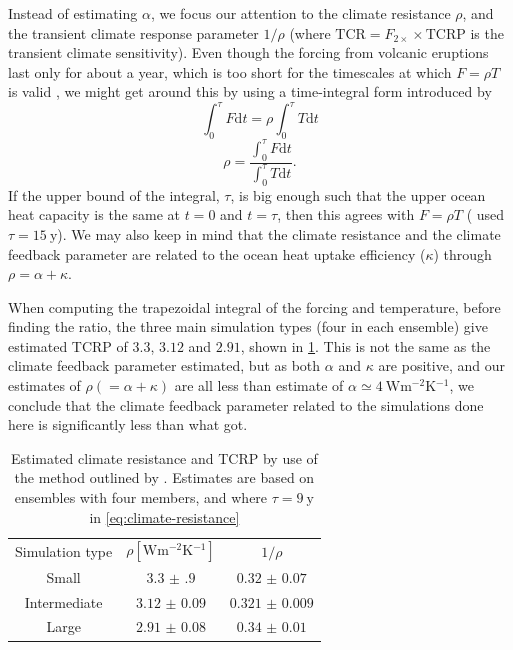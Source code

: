 \documentclass{ametsocV5}
\begin{document}
Instead of estimating \(\alpha \), we focus our attention to the climate resistance
\(\rho \), and the transient climate response parameter \(1/\rho\) (where
\(\mathrm{TCR}=F_{2\times}\times \mathrm{TCRP}\) is the transient climate sensitivity).
Even though the forcing from volcanic eruptions last only for about a year, which is too
short for the timescales at which \(F=\rho T\) is valid \citep{gregory2016}, we might
get around this by using a time-integral form introduced by \citet{merlis2014}
\begin{equation}
  \int_0^{\tau}F \mathrm{d}t=\rho\int_{0}^{\tau}T \mathrm{d}t
\end{equation}
\begin{equation}
  \rho=\frac{\int_0^{\tau}F \mathrm{d}t}{\int_{0}^{\tau}T \mathrm{d}t}.
  \label{eq:climate-resistance}
\end{equation}
If the upper bound of the integral, \(\tau \), is big enough such that the upper ocean
heat capacity is the same at \(t=0\) and \(t=\tau \), then this agrees with \(F=\rho T\)
\citep{gregory2016} (\citet{merlis2014} used \(\tau =\SI{15}{\mathrm{y}}\)). We may also
keep in mind that the climate resistance and the climate feedback parameter are related
to the ocean heat uptake efficiency (\(\kappa \)) through \(\rho =\alpha +\kappa \).

When computing the trapezoidal integral of the forcing and temperature, before finding
the ratio, the three main simulation types (four in each ensemble) give estimated TCRP
of \(3.3\), \(3.12\) and \(2.91\), shown in \cref{tab:trcp}. This is not the same as the
climate feedback parameter \citet{jones2005} estimated, but as both \(\alpha \) and
\(\kappa \) are positive, and our estimates of \(\rho (=\alpha +\kappa) \) are all less
than \citet{jones2005} estimate of \(\alpha \simeq
\SI{4}{\watt\metre^{-2}\kelvin^{-1}}\), we conclude that the climate feedback parameter
related to the simulations done here is significantly less than what \citet{jones2005}
got.

\begin{table}
  \centering
  \caption{Estimated climate resistance and TCRP by use of the method outlined by
    \citet{merlis2014}. Estimates are based on ensembles with four members, and where
    \(\tau =\SI{9}{\mathrm{y}}\) in \cref{eq:climate-resistance}}%
  \label{tab:trcp}
  \begin{tabular}{ccc}
    Simulation type & \(\rho [\si{\watt\metre^{-2}\kelvin^{-1}}]\) & \(1/\rho\)         \\
    Small           & \(\num{3.3(9)}\)                             & \(\num{0.32(7)}\)  \\
    Intermediate    & \(\num{3.12(9)}\)                            & \(\num{0.321(9)}\) \\
    Large           & \(\num{2.91(8)}\)                            & \(\num{0.34(1)}\)  \\
  \end{tabular}
\end{table}
\end{document}
